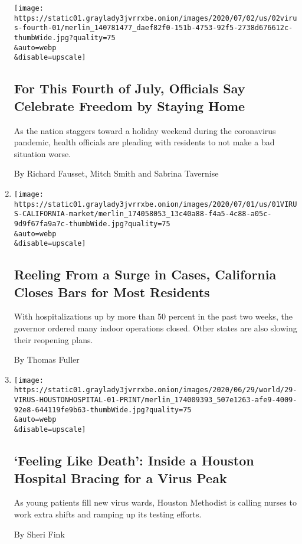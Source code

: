 \begin{enumerate}
  \texttt{[image: https://static01.graylady3jvrrxbe.onion/images/2020/07/02/us/02virus-fourth-01/merlin\_140781477\_daef82f0-151b-4753-92f5-2738d676612c-thumbWide.jpg?quality=75\\\&auto=webp\\\&disable=upscale]}

  \hypertarget{for-this-fourth-of-july-officials-say-celebrate-freedom-by-staying-home}{%
  \subsection{For This Fourth of July, Officials Say Celebrate Freedom
  by Staying
  Home}\label{for-this-fourth-of-july-officials-say-celebrate-freedom-by-staying-home}}

  As the nation staggers toward a holiday weekend during the coronavirus
  pandemic, health officials are pleading with residents to not make a
  bad situation worse.

  By Richard Fausset, Mitch Smith and Sabrina Tavernise
\item
  \href{/2020/07/01/us/california-coronavirus-reopening.html}{}

  \texttt{[image: https://static01.graylady3jvrrxbe.onion/images/2020/07/01/us/01VIRUS-CALIFORNIA-market/merlin\_174058053\_13c40a88-f4a5-4c88-a05c-9d9f67fa9a7c-thumbWide.jpg?quality=75\\\&auto=webp\\\&disable=upscale]}

  \hypertarget{reeling-from-a-surge-in-cases-california-closes-bars-for-most-residents}{%
  \subsection{Reeling From a Surge in Cases, California Closes Bars for
  Most
  Residents}\label{reeling-from-a-surge-in-cases-california-closes-bars-for-most-residents}}

  With hospitalizations up by more than 50 percent in the past two
  weeks, the governor ordered many indoor operations closed. Other
  states are also slowing their reopening plans.

  By Thomas Fuller
\item
  \href{/2020/06/28/us/coronavirus-hospital-houston.html}{}

  \texttt{[image: https://static01.graylady3jvrrxbe.onion/images/2020/06/29/world/29-VIRUS-HOUSTONHOSPITAL-01-PRINT/merlin\_174009393\_507e1263-afe9-4009-92e8-644119fe9b63-thumbWide.jpg?quality=75\\\&auto=webp\\\&disable=upscale]}

  \hypertarget{feeling-like-death-inside-a-houston-hospital-bracing-for-a-virus-peak}{%
  \subsection{`Feeling Like Death': Inside a Houston Hospital Bracing
  for a Virus
  Peak}\label{feeling-like-death-inside-a-houston-hospital-bracing-for-a-virus-peak}}

  As young patients fill new virus wards, Houston Methodist is calling
  nurses to work extra shifts and ramping up its testing efforts.

  By Sheri Fink
\end{enumerate}

